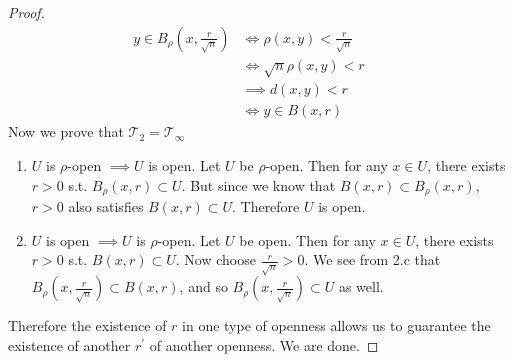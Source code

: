 \documentclass{article}
\begin{document}
\begin{proof}
        \begin{align}
          y \in B_\rho (x, \frac{r}{\sqrt{n}}) & \iff \rho(x, y) < \frac{r}{\sqrt{n}}\\ 
                                               & \iff \sqrt{n} \rho(x, y) < r && \tag{$n > 0$}\\
                                               & \implies d(x, y) < r && \tag{transitivity from 2.b}\\
                                               & \iff y \in B(x, r)
        \end{align}
        Now we prove that $\mathscr{T}_2 = \mathscr{T}_\infty$
        \begin{enumerate}
          \item $U$ is $\rho$-open $\implies U$ is open. Let $U$ be $\rho$-open. Then for any $x \in U$, there exists $r > 0$ s.t. $B_\rho (x, r) \subset U$. But since we know that $B(x, r) \subset B_\rho (x, r)$, $r > 0$ also satisfies $B(x, r) \subset U$. Therefore $U$ is open. 

          \item $U$ is open $\implies U$ is $\rho$-open. Let $U$ be open. Then for any $x \in U$, there exists $r > 0$ s.t. $B(x, r) \subset U$. Now choose $\frac{r}{\sqrt{n}} > 0$. We see from 2.c that $B_\rho (x, \frac{r}{\sqrt{n}}) \subset B(x, r)$, and so $B_\rho (x, \frac{r}{\sqrt{n}}) \subset U$ as well.  
        \end{enumerate}
        Therefore the existence of $r$ in one type of openness allows us to guarantee the existence of another $r^\prime$ of another openness. We are done. 
      \end{proof}
\end{document}
